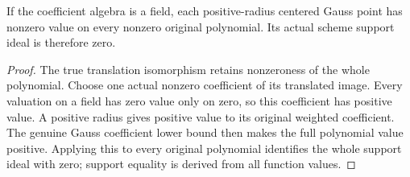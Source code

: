 \begin{theorem}
\label{spectrum:centered-gauss-generic-support}
\leanok
{}
If the coefficient algebra is a field, each positive-radius centered
Gauss point has nonzero value on every nonzero original polynomial.
Its actual scheme support ideal is therefore zero.
\end{theorem}
\begin{proof}
The true translation isomorphism retains nonzeroness of the whole
polynomial. Choose one actual nonzero coefficient of its translated
image. Every valuation on a field has zero value only on zero, so this
coefficient has positive value. A positive radius gives positive value
to its original weighted coefficient. The genuine Gauss coefficient
lower bound then makes the full polynomial value positive. Applying
this to every original polynomial identifies the whole support ideal
with zero; support equality is derived from all function values.
\end{proof}

